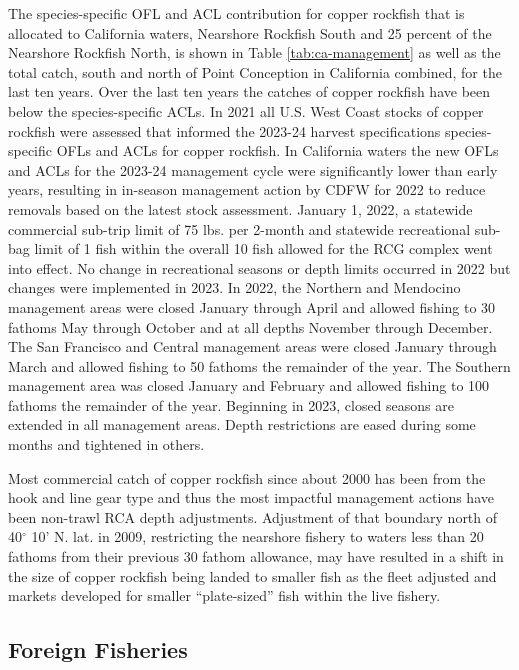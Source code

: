 \documentclass[11pt,
  english,
  letterpaper,
]{article}
\begin{document}
The species-specific OFL and ACL contribution for copper rockfish that is allocated to California waters, Nearshore Rockfish South and 25 percent of the Nearshore Rockfish North, is shown in Table \ref{tab:ca-management} as well as the total catch, south and north of Point Conception in California combined, for the last ten years. Over the last ten years the catches of copper rockfish have been below the species-specific ACLs. In 2021 all U.S. West Coast stocks of copper rockfish were assessed that informed the 2023-24 harvest specifications species-specific OFLs and ACLs for copper rockfish. In California waters the new OFLs and ACLs for the 2023-24 management cycle were significantly lower than early years, resulting in in-season management action by CDFW for 2022 to reduce removals based on the latest stock assessment. January 1, 2022, a statewide commercial sub-trip limit of 75 lbs. per 2-month and statewide recreational sub-bag limit of 1 fish within the overall 10 fish allowed for the RCG complex went into effect. No change in recreational seasons or depth limits occurred in 2022 but changes were implemented in 2023. In 2022, the Northern and Mendocino management areas were closed January through April and allowed fishing to 30 fathoms May through October and at all depths November through December. The San Francisco and Central management areas were closed January through March and allowed fishing to 50 fathoms the remainder of the year. The Southern management area was closed January and February and allowed fishing to 100 fathoms the remainder of the year. Beginning in 2023, closed seasons are extended in all management areas. Depth restrictions are eased during some months and tightened in others.

Most commercial catch of copper rockfish since about 2000 has been from the hook and line gear type and thus the most impactful management actions have been non-trawl RCA depth adjustments. Adjustment of that boundary north of 40\(^\circ\) 10' N. lat. in 2009, restricting the nearshore fishery to waters less than 20 fathoms from their previous 30 fathom allowance, may have resulted in a shift in the size of copper rockfish being landed to smaller fish as the fleet adjusted and markets developed for smaller ``plate-sized'' fish within the live fishery.

\hypertarget{foreign-fisheries}{%
\subsection{Foreign Fisheries}\label{foreign-fisheries}}
\end{document}
